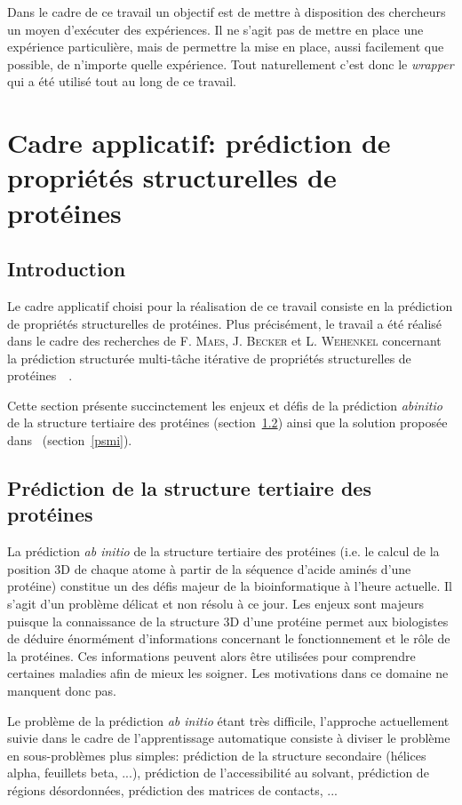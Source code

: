 \documentclass[a4paper, 11pt]{report}
\begin{document}
Dans le cadre de ce travail un objectif est de mettre à disposition des chercheurs un moyen d'exécuter des expériences. Il ne s'agit pas de mettre en place une expérience particulière, mais de permettre la mise en place, aussi facilement que possible, de n'importe quelle expérience. Tout naturellement c'est donc le \textit{wrapper} qui a été utilisé tout au long de ce travail.


\section{Cadre applicatif: prédiction de propriétés structurelles de protéines}
\label{proteines}
\subsection{Introduction}
Le cadre applicatif choisi pour la réalisation de ce travail consiste en la prédiction de propriétés structurelles de protéines. Plus précisément, le travail a été réalisé dans le cadre des recherches de F. \textsc{Maes}, J. \textsc{Becker} et L. \textsc{Wehenkel} concernant la prédiction structurée multi-tâche itérative de propriétés structurelles de protéines~\cite{CAP}~\cite{POSTER}.

Cette section présente succinctement les enjeux et défis de la prédiction \textit{abinitio} de la structure tertiaire des protéines (section~\ref{abinitio}) ainsi que la solution proposée dans~\cite{CAP} (section~\ref{psmi}). 

\subsection{Prédiction de la structure tertiaire des protéines}
\label{abinitio}
La prédiction \textit{ab initio} de la structure tertiaire des protéines (i.e. le calcul de la position 3D de chaque atome à partir de la séquence d'acide aminés d'une protéine) constitue un des défis majeur de la bioinformatique à l'heure actuelle. Il s'agit d'un problème délicat et non résolu à ce jour. Les enjeux sont majeurs puisque la connaissance de la structure 3D d'une protéine permet aux biologistes de déduire énormément d'informations concernant le fonctionnement et le rôle de la protéines. Ces informations peuvent alors être utilisées pour comprendre certaines maladies afin de mieux les soigner. Les motivations dans ce domaine ne manquent donc pas.

Le problème de la prédiction \textit{ab initio} étant très difficile, l'approche actuellement suivie dans le cadre de l'apprentissage automatique consiste à diviser le problème en sous-problèmes plus simples: prédiction de la structure secondaire (hélices alpha, feuillets beta, ...), prédiction de l'accessibilité au solvant, prédiction de régions désordonnées, prédiction des matrices de contacts, ...
\end{document}

